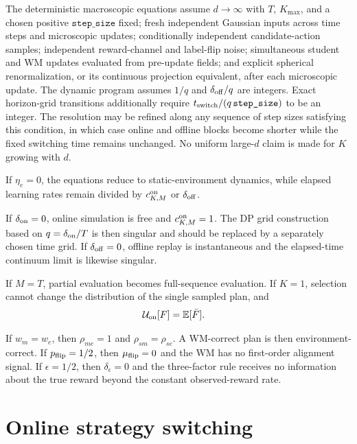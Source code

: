 \documentclass{article}
\begin{document}
The deterministic macroscopic equations assume $d\to\infty$ with $T$, $K_{\max}$, and a chosen positive $\texttt{step\_size}$ fixed; fresh independent Gaussian inputs across time steps and microscopic updates; conditionally independent candidate-action samples; independent reward-channel and label-flip noise; simultaneous student and WM updates evaluated from pre-update fields; and explicit spherical renormalization, or its continuous projection equivalent, after each microscopic update. The dynamic program assumes $1/q$ and $\delta_{\rm off}/q$ are integers. Exact horizon-grid transitions additionally require $t_{\rm switch}/(q\,\texttt{step\_size})$ to be an integer. The resolution may be refined along any sequence of step sizes satisfying this condition, in which case online and offline blocks become shorter while the fixed switching time remains unchanged. No uniform large-$d$ claim is made for $K$ growing with $d$.

If $\eta_e=0$, the equations reduce to static-environment dynamics, while elapsed learning rates remain divided by $c_{K,M}^{\rm on}$ or $\delta_{\rm off}$.

If $\delta_{\rm on}=0$, online simulation is free and $c_{K,M}^{\rm on}=1$. The DP grid construction based on $q=\delta_{\rm on}/T$ is then singular and should be replaced by a separately chosen time grid. If $\delta_{\rm off}=0$, offline replay is instantaneous and the elapsed-time continuum limit is likewise singular.

If $M=T$, partial evaluation becomes full-sequence evaluation. If $K=1$, selection cannot change the distribution of the single sampled plan, and
\begin{align}
\mathcal U_{\rm on}[F] &= \mathbb E[\bar F].
\end{align}

If $w_m=w_e$, then $\rho_{me}=1$ and $\rho_{sm}=\rho_{se}$. A WM-correct plan is then environment-correct. If $p_{\rm flip}=1/2$, then $\mu_{\rm flip}=0$ and the WM has no first-order alignment signal. If $\epsilon=1/2$, then $\delta_\epsilon=0$ and the three-factor rule receives no information about the true reward beyond the constant observed-reward rate.


\clearpage
\appendix
\section{Online strategy switching}
\end{document}
